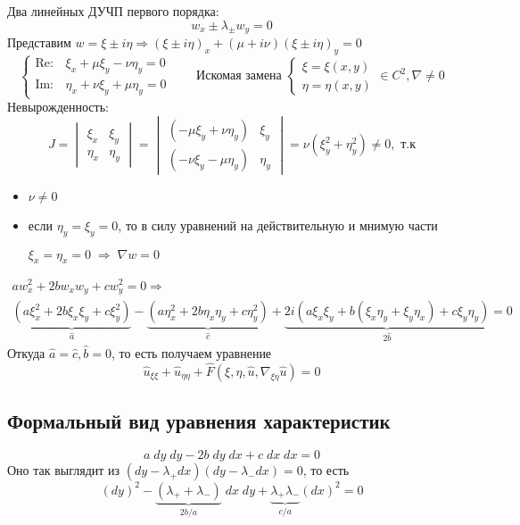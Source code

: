 \documentclass[../main.tex]{subfiles}
\begin{document}
Два линейных ДУЧП первого порядка:
$$
w_x \pm \lambda_\pm w_y = 0
$$
Представим $w = \xi \pm i\eta \Rightarrow
(\xi \pm i\eta)_x + (\mu + i\nu)(\xi \pm i\eta)_y = 0$
$$
\begin{cases}
    \mathrm{Re:} & \xi_x + \mu\xi_y - \nu\eta_y = 0\\
    \mathrm{Im:} & \eta_x + \nu\xi_y + \mu\eta_y = 0
\end{cases}\qquad \text{Искомая замена }
\begin{cases}
    \xi = \xi(x, y) \\
    \eta = \eta(x, y)
\end{cases} \in C^2, \nabla \ne 0
$$
Невырожденность:
$$ J = 
\begin{vmatrix}
    \xi_x & \xi_y \\
    \eta_x & \eta_y
\end{vmatrix} =
\begin{vmatrix}
    (-\mu\xi_y + \nu\eta_y) & \xi_y \\
    (-\nu\xi_y - \mu\eta_y) & \eta_y
\end{vmatrix} =
\nu (\xi_y^2 + \eta_y^2) \neq 0, \text{ т.к} $$
\begin{itemize}
    \item $\nu \neq 0$
    \item если $\eta_y = \xi_y = 0$, то в силу уравнений на действительную и мнимую части
    
    $\xi_x = \eta_x = 0 \; \Rightarrow \; \nabla w = 0$
\end{itemize}
\begin{multline*}
a w_x^2 + 2bw_x w_y + c w_y^2 = 0 \Rightarrow \\
\underbrace{(a\xi^2_x + 2b\xi_x\xi_y + c\xi_y^2)}_{\hat a} -
\underbrace{(a\eta_x^2 + 2b\eta_x\eta_y + c\eta_y^2)}_{\hat c}+ 
\underbrace{2i(a\xi_x\xi_y + b(\xi_x\eta_y + \xi_y\eta_x) + c\xi_y\eta_y)}_{2\hat b} = 0
\end{multline*}
Откуда $\hat a = \hat c, \hat b = 0$, то есть получаем уравнение
$$
\hat u_{\xi\xi} + \hat u_{\eta\eta} + \hat F(\xi, \eta, \hat u, \nabla_{\xi\eta}\hat u) = 0
$$
\subsection{Формальный вид уравнения характеристик}
$$
a\;dy\;dy - 2b\;dy\;dx + c\;dx\;dx =0
$$
Оно так выглядит из $(dy - \lambda_+dx)(dy - \lambda_-dx)=0$, то есть 
$$
(dy)^2 - \underbrace{(\lambda_+ + \lambda_-)}_{2b/a}\;dx\;dy + \underbrace{\lambda_+\lambda_-}_{c/a}(dx)^2 = 0
$$
\end{document}
